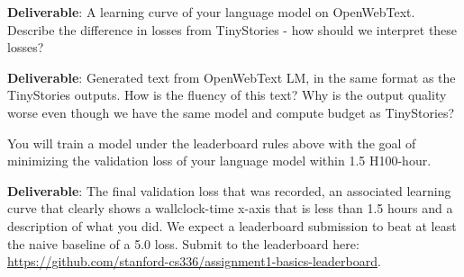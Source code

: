 \textbf{Deliverable}: A learning curve of your language model on OpenWebText. Describe the difference in losses from TinyStories - how should we interpret these losses?

\textbf{Deliverable}: Generated text from OpenWebText LM, in the same format as the TinyStories outputs. How is the fluency of this text? Why is the output quality worse even though we have the same model and compute budget as TinyStories?

\begin{answer}

\end{answer}


You will train a model under the leaderboard rules above with the goal of minimizing the validation loss of your language model within 1.5 H100-hour.

\textbf{Deliverable}: The final validation loss that was recorded, an associated learning curve that clearly shows a wallclock-time x-axis that is less than 1.5 hours and a description of what you did. We expect a leaderboard submission to beat at least the naive baseline of a 5.0 loss. Submit to the leaderboard here: \url{https://github.com/stanford-cs336/assignment1-basics-leaderboard}.

\begin{answer}

\end{answer}

